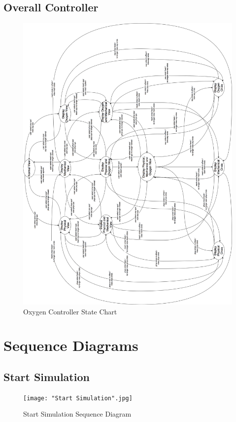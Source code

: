 \documentclass[12pt, titlepage]{article}
\begin{document}
\subsection{Overall Controller}\begin{figure}[H]
\centering
\includegraphics[width=180mm]{OC.png}
\caption{Oxygen Controller State Chart}
\end{figure}

\section{Sequence Diagrams}
\label{sec:sequence_diagrams}
\subsection*{Start Simulation}
\begin{figure}[H]
\centering
\texttt{[image: "Start Simulation".jpg]}
\caption{Start Simulation Sequence Diagram}
\end{figure}
\end{document}
